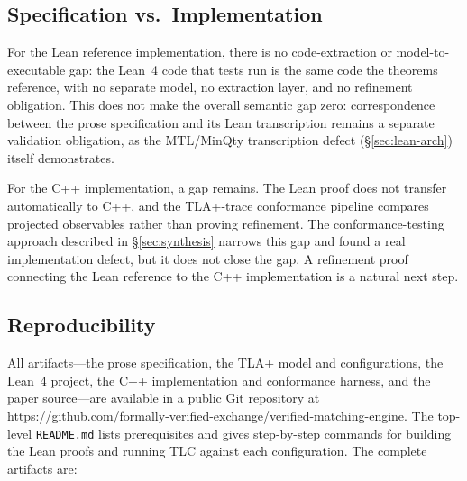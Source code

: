 \documentclass[11pt,a4paper]{article}
\begin{document}
\subsection{Specification vs.\ Implementation}

For the Lean reference implementation, there is no code-extraction or
model-to-executable gap: the Lean~4 code that tests run is the same
code the theorems reference, with no separate model, no extraction
layer, and no refinement obligation. This does not make the overall
semantic gap zero: correspondence between the prose specification and
its Lean transcription remains a separate validation obligation, as
the MTL/MinQty transcription defect (\S\ref{sec:lean-arch}) itself
demonstrates.

For the C++ implementation, a gap remains. The Lean proof does not
transfer automatically to C++, and the TLA+-trace conformance pipeline
compares projected observables rather than proving refinement. The
conformance-testing approach described in \S\ref{sec:synthesis} narrows
this gap and found a real implementation defect, but it does not close
the gap. A refinement proof connecting the Lean reference to the C++
implementation is a natural next step.

\subsection{Reproducibility}

All artifacts---the prose specification, the TLA+ model and
configurations, the Lean~4 project, the C++ implementation and
conformance harness, and the paper source---are available
in a public Git repository at
\url{https://github.com/formally-verified-exchange/verified-matching-engine}.
The top-level \texttt{README.md} lists prerequisites and gives
step-by-step commands for building the Lean proofs and running TLC
against each configuration. The complete artifacts are:
\end{document}
